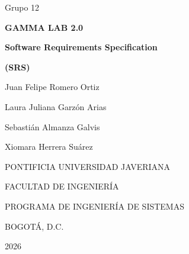 \documentclass[12pt, letterpaper]{article}
\begin{document}
\providecommand{\tituloProyecto}{GAMMA LAB 2.0}
\providecommand{\grupo}{Grupo 12}
\providecommand{\autorUno}{Juan Felipe Romero Ortiz}
\providecommand{\autorDos}{Laura Juliana Garzón Arias}
\providecommand{\autorTres}{Sebastián Almanza Galvis}
\providecommand{\autorCuatro}{Xiomara Herrera Suárez}
\providecommand{\leyendaGrado}{MEMORIA DE PROYECTO DE GRADO REALIZADO PARA CUMPLIR UNO DE
LOS REQUISITOS PARA EL TÍTULO EN INGENIERÍA DE SISTEMAS}
\providecommand{\director}{Ing. Cécile Gauthier Umaña}
\providecommand{\juradoUno}{Ing. Nombre del Primer Jurado}
\providecommand{\juradoDos}{Ing. Nombre del Segundo Jurado}
\providecommand{\universidad}{PONTIFICIA UNIVERSIDAD JAVERIANA}
\providecommand{\universidadNombre}{Pontificia Universidad Javeriana}
\providecommand{\facultad}{FACULTAD DE INGENIERÍA}
\providecommand{\programa}{PROGRAMA DE INGENIERÍA DE SISTEMAS}
\providecommand{\ciudad}{BOGOTÁ, D.C.}
\providecommand{\anio}{2026}
\providecommand{\fechaLarga}{Noviembre, 2026}
\providecommand{\rector}{Nombre del Rector, S.J.}
\providecommand{\decano}{Ing. Nombre del Decano de la Facultad}
\providecommand{\directorDepto}{Ing. Nombre del Director de Departamento, Ph.D.}
\providecommand{\directorCarrera}{Ing. Nombre de la Directora de Carrera}

\begingroup\setlength{\parskip}{0pt}%

\thispagestyle{empty}
\begin{center}
  \vspace*{1cm}
  {\large \grupo}\par\vspace{1.2cm}
  {\LARGE\bfseries \tituloProyecto}\par\vspace{1cm}
  {\Large\bfseries Software Requirements Specification}\par\vspace{0.3cm}
  {\large\bfseries (SRS)}\par\vspace{2cm}
  \autorUno\par
  \autorDos\par
  \autorTres\par
  \autorCuatro\par
  \vfill
  \universidad\par
  \facultad\par
  \programa\par
  \ciudad\par
  \anio\par
  \vspace{1cm}
\end{center}
\clearpage
\end{document}
